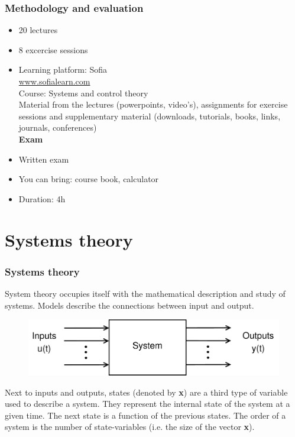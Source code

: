 \documentclass{beamer}
\begin{document}
\begin{frame}
\frametitle{Methodology and evaluation}
\begin{itemize}
\item 20 lectures \\
\item 8 excercise sessions\\
\item Learning platform: Sofia\\
\url{www.sofialearn.com}\\
Course: Systems and control theory\\
Material from the lectures (powerpoints, video's), assignments for exercise sessions and supplementary material (downloads, tutorials, books, links, journals, conferences)\\
\bigskip
\textbf{Exam}
\item Written exam
\item You can bring: course book, calculator
\item Duration: 4h
\end{itemize}
\end{frame}


\begin{frame}
\frametitle{}
\end{frame}

\section{Systems theory} 

\begin{frame}
\frametitle{Systems theory}
System theory occupies itself with the mathematical description and study of systems.
Models describe the connections between input and output.\\
\bigskip
\begin{figure}
\includegraphics[width=.8\linewidth]{systems_theory}
\end{figure}
Next to inputs and outputs, states (denoted by \textbf x) are a third type of variable used to describe a system. They represent the internal state of the system at a given time. The next state is a function of the previous states.
The order of a system is the number of state-variables (i.e. the size of the vector \textbf x).\\
\bigskip
\end{frame}
\end{document}
